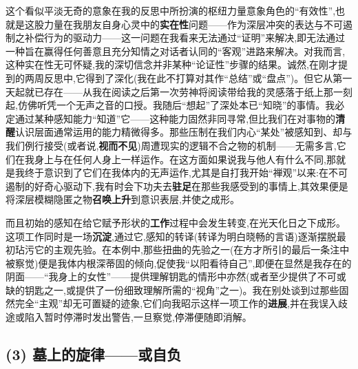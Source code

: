 这个看似平淡无奇的意象在我的反思中所扮演的枢纽力量意象角色的“有效性”,也就是这股力量在我朋友自身心灵中的\textbf{实在性}问题——作为深层冲突的表达与不可遏制之补偿行为的驱动力\dmark{}——这一问题在我看来无法通过“证明”来解决,即无法通过一种旨在赢得任何善意且充分知情之对话者认同的“客观”进路来解决。对我而言,这种实在性无可怀疑,我的深切信念并非某种“论证性”步骤的结果。诚然,在刚才提到的两周反思中,它得到了深化(我在此不打算对其作“总结”或“盘点”)。但它从第一天起就已存在——从我在阅读之后第一次劳神将阅读带给我的灵感落于纸上那一刻起,仿佛听凭一个无声之音的口授。我随后“想起”了深处本已“知晓”的事情。我必定通过某种感知能力“知道”它——这种能力固然非同寻常,但比我们在对事物的\textbf{清醒}认识层面通常运用的能力精微得多。那些压制在我们内心“某处”被感知到、却与我们例行接受(或者说,\textbf{视而不见})周遭现实的逻辑不合之物的机制——无需多言,它们在我身上与在任何人身上一样运作。在这方面如果说我与他人有什么不同,那就是我终于意识到了它们在我体内的无声运作,尤其是自打我开始“禅观”以来:在不可遏制的好奇心驱动下,我有时会下功夫去\textbf{驻足}在那些我感受到的事情上,其效果便是将深层模糊隐匿之物\textbf{召唤上升}到意识表层,并使之成形。

而且初始的感知在给它赋予形状的\textbf{工作}过程中会发生转变,在光天化日之下成形\dmark{}。这项工作同时是一场\textbf{沉淀},通过它,感知的转译(转译为明白晓畅的言语)逐渐摆脱最初玷污它的主观先验。在本例中,那些扭曲的先验之一(在方才所引的最后一条注中被察觉)便是我体内根深蒂固的倾向,促使我“以阳看待自己”,即便在显然是我存在的阴面——“我身上的女性”——提供理解钥匙的情形中亦然(或者至少提供了不可或缺的钥匙之一,或提供了一份细致理解所需的“视角”之一)。我在别处谈到过那些固然完全“主观”却无可置疑的迹象,它们向我昭示这样一项工作的\textbf{进展},并在我误入歧途或陷入暂时停滞时发出警告,一旦察觉,停滞便随即消解。

\subsection{(3) 墓上的旋律——或自负}


